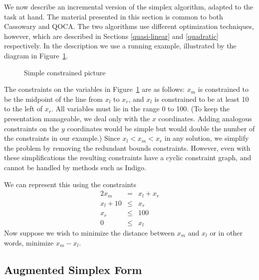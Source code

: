 \documentclass{article}
\begin{document}
We now describe an incremental version of the simplex algorithm, adapted to
the task at hand.
The material presented in this section is common to both
Cassowary and QOCA\@.  
The two algorithms use different optimization
techniques, however, which are described in Sections \ref{quasi-linear} and
\ref{quadratic} respectively.  
In the description we use a running example,
illustrated by the diagram in Figure~\ref{fig:pict}.

\begin{figure}[htb]
\begin{center}

\end{center}
\caption{Simple constrained picture\label{fig:pict}}
\end{figure}

The constraints on the variables in Figure~\ref{fig:pict} are as follows:
$x_m$ is constrained to be the midpoint of the line from $x_l$ to $x_r$,
and $x_l$ is constrained to be at least 10 to the left of $x_r$.  All
variables must lie in the range 0 to 100.  (To keep the presentation
manageable, we deal only with the $x$ coordinates.  Adding analogous
constraints on the $y$ coordinates would be simple but would double the
number of the constraints in our example.)  Since $x_l < x_m < x_r$ in any
solution, we simplify the problem by removing the redundant bounds
constraints.  However,
even with these simplifications the resulting constraints have a cyclic
constraint graph, and cannot be handled by methods such as Indigo.

We can represent this using the constraints
$$\begin{array}{rcl}
2 x_m &=& x_l + x_r \\
x_l + 10 &\leq &x_r \\
x_r &\leq& 100 \\
0 &\leq& x_l
\end{array}$$
Now suppose  we wish to minimize the distance between
$x_m$ and $x_l$ or in other words, minimize $x_m - x_l$.

\subsection{Augmented Simplex Form}
\label{augmented-simplex-form}
\end{document}
